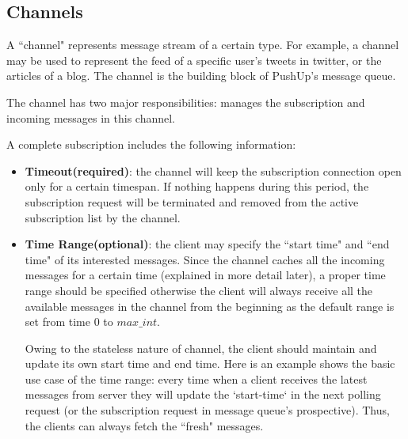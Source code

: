 \subsection{Channels\\}

A ``channel" represents message stream of a certain type. For example, a
channel may be used to represent the feed of a specific user's tweets in
twitter, or the articles of a blog. The channel is the building block of 
PushUp's message queue.

The channel has two major responsibilities: manages the subscription and
incoming messages in this channel.

A complete subscription includes the following information:

\begin{itemize}
    \item {\bf Timeout(required)}: the channel will keep the subscription 
        connection open only for a certain timespan. If nothing happens 
        during this period, the
        subscription request will be terminated and removed from the active 
        subscription list by the channel.
    \item {\bf Time Range(optional)}: the client may specify the ``start time"
        and ``end time" of its interested messages. Since the channel 
        caches all the incoming messages for a certain time (explained in more detail later), 
        a proper time range should be specified otherwise the client will 
        always receive all the available messages in the channel from the beginning
		as the default range is set from time $0$ to $max\_int$.

        Owing to the stateless nature of channel, the client should 
        maintain and update its own start time and end time. 
        Here is an example shows the basic use case of the time range:
        every time when a client receives the latest messages from server
        they will update the `start-time` in the next polling request (or 
        the subscription request in message queue's prospective). Thus, the
        clients can always fetch the ``fresh" messages.
\end{itemize}


